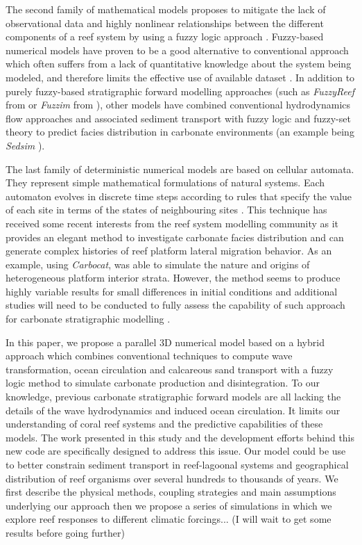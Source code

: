 \documentclass[default,jgrga]{agutex2015}
\begin{document}
\begin{article}
\noindent The second family of mathematical models proposes to mitigate the lack of observational data and highly nonlinear relationships between the different components of a reef system by using a fuzzy logic approach \citep{Meesters98}. Fuzzy-based numerical models have proven to be a good alternative to conventional approach which often suffers from a lack of quantitative knowledge about the system being modeled, and therefore limits the effective use of available dataset \citep{Parcell98}. In addition to purely fuzzy-based stratigraphic forward modelling approaches (such as \textit{FuzzyReef} from \citet{Parcell03} or \textit{Fuzzim} from \citet{Nordlund99}), other models have combined conventional hydrodynamics flow approaches and associated sediment transport with fuzzy logic and fuzzy-set theory to predict facies distribution in carbonate environments (an example being \textit{Sedsim} \citep{Griffiths01, Salles11}).

\noindent The last family of deterministic numerical models are based on cellular automata. They represent simple mathematical formulations of natural systems. Each automaton evolves in discrete time steps according to rules that specify the value of each site in terms of the states of neighbouring sites \citep{Wolfram84}. This technique has received some recent interests from the reef system modelling community as it provides an elegant method to investigate carbonate facies distribution and can generate complex histories of reef platform lateral migration behavior. As an example, using \textit{Carbocat}, \citet{Burgess13} was able to simulate the nature and origins of heterogeneous platform interior strata. However, the method seems to produce highly variable results for small differences in initial conditions and additional studies will need to be conducted to fully assess the capability of such approach for carbonate stratigraphic modelling \citep{Burgess13}.

In this paper, we propose a parallel 3D numerical model based on a hybrid approach which combines conventional techniques to compute wave transformation, ocean circulation and calcareous sand transport with a fuzzy logic method to simulate carbonate production and disintegration. To our knowledge, previous carbonate stratigraphic forward models are all lacking the details of the wave hydrodynamics and induced ocean circulation. It limits our understanding of coral reef systems and the predictive capabilities of these models. The work presented in this study and the development efforts behind this new code are specifically designed to address this issue. Our model could be use to better constrain sediment transport in reef-lagoonal systems and geographical distribution of reef organisms over several hundreds to thousands of years. We first describe the physical methods, coupling strategies and main assumptions underlying our approach then we propose a series of simulations in which we explore reef responses to different climatic forcings... (I will wait to get some results before going further)


\end{article}
\end{document}
